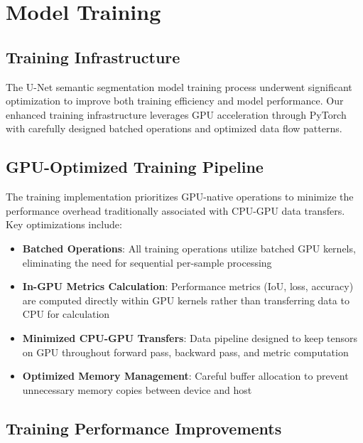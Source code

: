 \section{Model Training}\label{sec:model-training}

\subsection{Training Infrastructure}\label{subsec:training-infrastructure}

The U-Net semantic segmentation model training process underwent significant optimization to improve both training efficiency and model performance. Our enhanced training infrastructure leverages GPU acceleration through PyTorch~\cite{pytorch2023} with carefully designed batched operations and optimized data flow patterns.

\subsection{GPU-Optimized Training Pipeline}\label{subsec:gpu-optimized-training}

The training implementation prioritizes GPU-native operations to minimize the performance overhead traditionally associated with CPU-GPU data transfers. Key optimizations include:

\begin{itemize}
\item \textbf{Batched Operations}: All training operations utilize batched GPU kernels, eliminating the need for sequential per-sample processing
\item \textbf{In-GPU Metrics Calculation}: Performance metrics (IoU, loss, accuracy) are computed directly within GPU kernels rather than transferring data to CPU for calculation~\cite{elvinger2025gpu}
\item \textbf{Minimized CPU-GPU Transfers}: Data pipeline designed to keep tensors on GPU throughout forward pass, backward pass, and metric computation
\item \textbf{Optimized Memory Management}: Careful buffer allocation to prevent unnecessary memory copies between device and host
\end{itemize}

\subsection{Training Performance Improvements}\label{subsec:training-performance}

